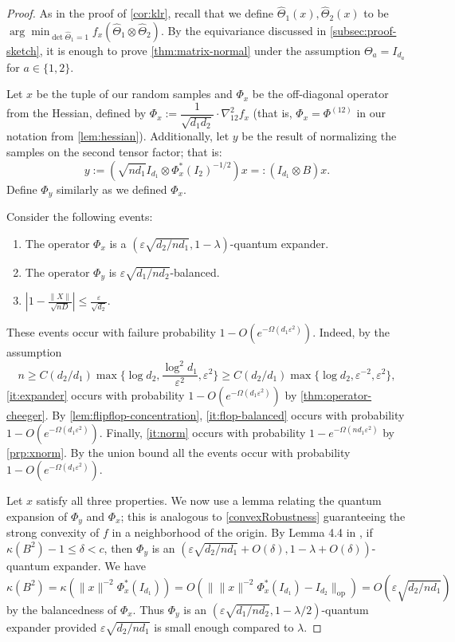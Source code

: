 \documentclass[aos]{imsart}
\newenvironment{customthm}[1]{\renewcommand\theinnercustomthm{#1}\innercustomthm}{\endinnercustomthm}
\theoremstyle{definition}
\numberwithin{equation}{section}
\DeclareMathOperator{\op}{op}
\newcommand{\htheta}{\widehat{\Theta}}
\newcommand{\ot}{\otimes}
\newcommand{\eps}{\varepsilon}
\newcommand{\samp}{x}
\newcommand{\rv}{x}
\newcommand{\AR}[1]{{\color{orange}[AR: #1]}}
\newcommand{\AR}[1]{{}}
\begin{document}
\begin{customthm}{\ref{thm:matrix-normal}}[Matrix normal spectral error, restated]
\MatrixSpec
\end{customthm}
\begin{proof}
As in the proof of \cref{cor:klr}, recall that we define $\htheta_1(\samp), \htheta_2(\samp)$ to be $\arg\min_{\det \htheta_1 = 1} f_\samp(\htheta_1 \ot \htheta_2)$. By the equivariance discussed in \cref{subsec:proof-sketch}, it is enough to prove \cref{thm:matrix-normal} under the assumption $\Theta_a = I_{d_a}$ for $a \in \{1,2\}$.

\noindent Let $\rv$ be the tuple of our random samples and $\Phi_\rv$ be the off-diagonal operator from the Hessian, defined by $\Phi_\rv := \dfrac{1}{\sqrt{d_1 d_2}} \cdot \nabla^2_{12}f_x$ (that is, $\Phi_\rv = \Phi^{(12)}$ in our notation from \cref{lem:hessian}).
Additionally, let $y$ be the result of normalizing the samples on the second tensor factor; that is:
$$y := (\sqrt{ nd_1} I_{d_1} \ot \Phi_x^*(I_2)^{-1/2}) x =: (I_{d_1} \ot B)x.$$
\noindent Define $\Phi_y$ similarly as we defined $\Phi_\rv$.

Consider the following events:
\begin{enumerate}
\item\label{it:expander} The operator $\Phi_{\rv}$ is a $(\eps  \sqrt{{d_2}/{n d_1}},1-\lambda)$-quantum expander.
\item\label{it:flop-balanced} The operator $\Phi_y$ is $\eps \sqrt{{d_1}/{n d_2}}$-balanced.
\item \label{it:norm} $|1 - \frac{\|X\|}{\sqrt{nD}}| \leq \frac{\eps}{\sqrt{d_2}}. $
\end{enumerate}
These events occur with failure probability $1 - O(e^{ - \Omega( d_1 \eps^2)}).$ Indeed, by the assumption
$$n \geq C (d_2/d_1) \max\{\log d_2, \frac{\log^2 d_1}{\eps^2}, \eps^2\} \geq C (d_2/d_1) \max\{\log d_2, \eps^{-2}, \eps^2\},$$
\cref{it:expander} occurs with probability $1 - O(e^{ - \Omega( d_1 \eps^2)})$ by \cref{thm:operator-cheeger}. By \cref{lem:flipflop-concentration}, \cref{it:flop-balanced} occurs with probability $1 - O(e^{ - \Omega( d_1 \eps^2)}).$ Finally, \cref{it:norm} occurs with probability $1 - e^{- \Omega(n d_1 \eps^2)}$ by \cref{prp:xnorm}. By the union bound all the events occur with probability $1 - O(e^{ - \Omega( d_1 \eps^2)})$.

Let $\samp$ satisfy all three properties.
We now use a lemma relating the quantum expansion of $\Phi_y$ and $\Phi_\samp$; this is analogous to \cref{convexRobustness} guaranteeing the strong convexity of $f$ in a neighborhood of the origin.
By Lemma 4.4 in \cite{FM20}, if $\kappa(B^2) - 1 \leq \delta < c$,  then $\Phi_y$ is an $(\eps \sqrt{d_2/n d_1} + O(\delta), 1 - \lambda + O(\delta))$-quantum expander.
We have
$$\kappa(B^2) = \kappa(\|x\|^{-2} \Phi_\samp^*(I_{d_1})) = O(\|\|x\|^{-2} \Phi_\samp^*(I_{d_1}) - I_{d_2}\|_{\op}) = O(\eps \sqrt{d_2/nd_1})$$
by the balancedness of $\Phi_x$.
Thus $\Phi_y$ is an $(\eps \sqrt{d_1 / n d_2}, 1 - \lambda/2)$-quantum expander provided $\eps \sqrt{d_2/nd_1}$ is small enough compared to $\lambda$.


\end{proof}
\end{document}
